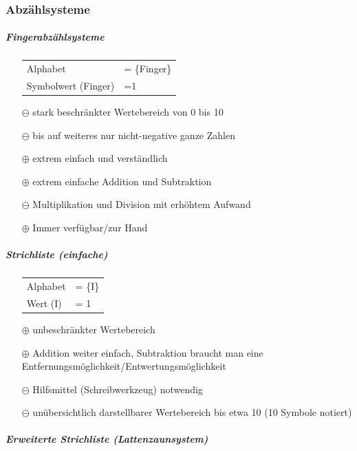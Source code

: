 \documentclass[10pt,a4paper]{scrartcl}
\begin{document}
	\subsubsection{Abzählsysteme}
	\subparagraph{Fingerabzählsysteme}
	\begin{itemize}
		\item[] \begin{tabular}[t]{ll}
			Alphabet & = \{Finger\}\\
			Symbolwert (Finger) & =1\\
		\end{tabular}
		\item[$ \ominus $] stark beschränkter Wertebereich von 0 bis 10
		\item[$ \ominus $] bis auf weiteres nur nicht-negative ganze Zahlen
		\item[$ \oplus $] extrem einfach und verständlich		
		\item[$ \oplus $] extrem einfache Addition und Subtraktion
		\item[$ \ominus $] Multiplikation und Division mit erhöhtem Aufwand
		\item[$ \oplus $] Immer verfügbar/\glqq zur Hand\grqq\
	\end{itemize}
	\subparagraph{Strichliste (einfache)}
	\begin{itemize}
		\item[] \begin{tabular}[t]{ll}
		Alphabet &= \{I\}\\
		Wert (I) &= 1\\			
		\end{tabular}
		\item[$ \oplus $] unbeschränkter Wertebereich
		\item[$ \oplus $] Addition weiter einfach, Subtraktion braucht man eine Entfernungsmöglichkeit/Entwertungsmöglichkeit
		\item[$ \ominus $] Hilfsmittel (Schreibwerkzeug) notwendig
		\item[$ \ominus $] unübersichtlich darstellbarer Wertebereich bis etwa 10 (10 Symbole notiert)
	\end{itemize}
	\subparagraph{Erweiterte Strichliste (\glqq Lattenzaunsystem\grqq)}
\end{document}
